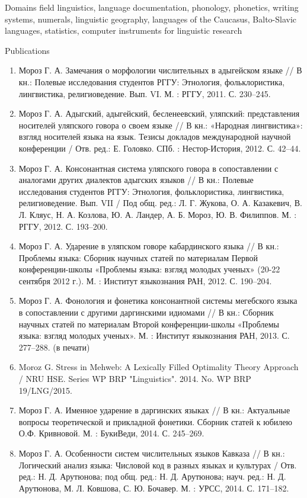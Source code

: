 \documentclass{resume} %
\begin{document}
\begin{rSection}{Domains}
field linguistics, language documentation, phonology, phonetics, writing systems, numerals, linguistic geography, languages of the Caucasus, Balto-Slavic languages, statistics, computer instruments for linguistic research
\end{rSection}

\begin{rSection}{Publications}
\begin{enumerate}
\item Мороз Г. А. Замечания о морфологии числительных в адыгейском языке // В кн.: Полевые исследования студентов РГГУ: Этнология, фольклористика, лингвистика, религиоведение. Вып. VI. М. : РГГУ, 2011. С. 230--245.
\item Мороз Г. А. Адыгский, адыгейский, бесленеевский, уляпский: представления носителей уляпского говора о своем языке // В кн.: «Народная лингвистика»: взгляд носителей языка на язык. Тезисы докладов международной научной конференции / Отв. ред.: Е. Головко. СПб. : Нестор-История, 2012. С. 42--44.
\item Мороз Г. А. Консонантная система уляпского говора в сопоставлении с аналогами других диалектов адыгских языков // В кн.: Полевые исследования студентов РГГУ: Этнология, фольклористика, лингвистика, религиоведение. Вып. VII / Под общ. ред.: Л. Г. Жукова, О. А. Казакевич, В. Л. Кляус, Н. А. Козлова, Ю. А. Ландер, А. Б. Мороз, Ю. В. Филиппов. М. : РГГУ, 2012. С. 193--200.
\item Мороз Г. А. Ударение в уляпском говоре кабардинского языка // В кн.: Проблемы языка: Сборник научных статей по материалам Первой конференции-школы «Проблемы языка: взгляд молодых ученых» (20-22 сентября 2012 г.). М. : Институт языкознания РАН, 2012. С. 190--204.
\item Мороз Г. А. Фонология и фонетика консонантной системы мегебского языка в сопоставлении с другими даргинскими идиомами // В кн.: Сборник научных статей по материалам Второй конференции-школы «Проблемы языка: взгляд молодых ученых». М. : Институт языкознания РАН, 2013. С. 277--288. (в печати)
\item Moroz G. Stress in Mehweb: A Lexically Filled Optimality Theory Approach / NRU HSE. Series WP BRP "Linguistics". 2014. No. WP BRP 19/LNG/2015.
\item Мороз Г. А. Именное ударение в даргинских языках // В кн.: Актуальные вопросы теоретической и прикладной фонетики. Сборник статей к юбилею О.Ф. Кривновой. М. : БукиВеди, 2014. С. 245--269.
\item Мороз Г. А. Особенности систем числительных языков Кавказа // В кн.: Логический анализ языка: Числовой код в разных языках и культурах / Отв. ред.: Н. Д. Арутюнова; под общ. ред.: Н. Д. Арутюнова; науч. ред.: Н. Д. Арутюнова, М. Л. Ковшова, С. Ю. Бочавер. М. : УРСС, 2014. С. 171--182.

\end{enumerate}
\end{rSection}
\end{document}
